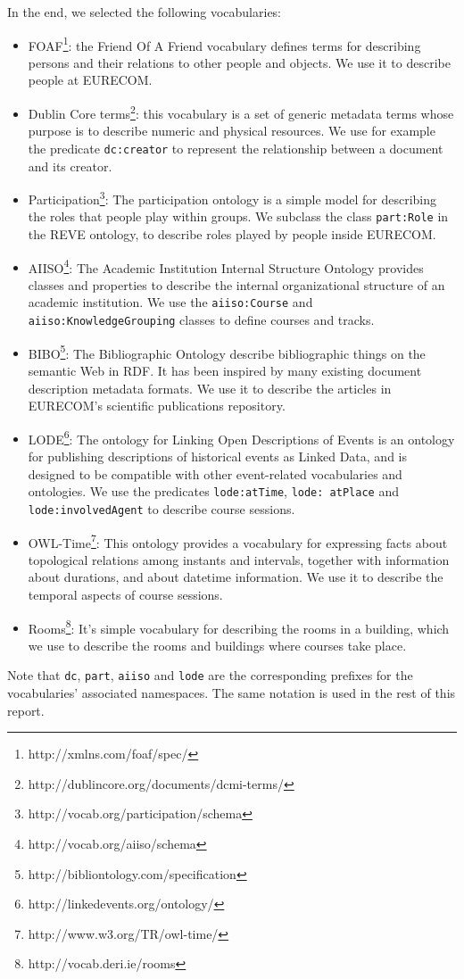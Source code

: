\documentclass[a4paper,11pt]{report}
\begin{document}
In the end, we selected the following vocabularies: 
\begin{itemize}
\item FOAF\footnote{http://xmlns.com/foaf/spec/}: the Friend Of A Friend vocabulary defines terms for describing persons and their relations to other people and objects. We use it to describe people at \mbox{EURECOM}. 
\item Dublin Core terms\footnote{http://dublincore.org/documents/dcmi-terms/}: this vocabulary is a set of generic metadata terms whose purpose is to describe numeric and physical resources. We use for example the predicate \texttt{dc:creator} to represent the relationship between a document and its creator. 
\item Participation\footnote{http://vocab.org/participation/schema}: The participation ontology is a simple model for describing the roles that people play within groups. We subclass the class \texttt{part:Role} in the REVE ontology, to describe roles played by people inside \mbox{EURECOM}. 
\item AIISO\footnote{http://vocab.org/aiiso/schema}: The Academic Institution Internal Structure Ontology provides classes and properties to describe the internal organizational structure of an academic institution. We use the \texttt{aiiso:Course} and \texttt{aiiso:KnowledgeGrouping} classes to define courses and tracks. 
\item BIBO\footnote{http://bibliontology.com/specification}:  The Bibliographic Ontology describe bibliographic things on the semantic Web in RDF. It has been inspired by many existing document description metadata formats. We use it to describe the articles in \mbox{EURECOM}'s scientific publications repository. 
\item LODE\footnote{http://linkedevents.org/ontology/}: The ontology for Linking Open Descriptions of Events is an ontology for publishing descriptions of historical events as Linked Data, and is designed to be compatible with other event-related vocabularies and ontologies. We use the predicates \texttt{lode:atTime}, \texttt{lode: atPlace} and \texttt{lode:involvedAgent} to describe course sessions. 
\item OWL-Time\footnote{http://www.w3.org/TR/owl-time/}: This ontology provides a vocabulary for expressing facts about topological relations among instants and intervals, together with information about durations, and about datetime information. We use it to describe the temporal aspects of course sessions. 
\item Rooms\footnote{http://vocab.deri.ie/rooms}: It's simple vocabulary for describing the rooms in a building, which we use to describe the rooms and buildings where courses take place. 
\end{itemize}
Note that \texttt{dc},  \texttt{part},  \texttt{aiiso} and  \texttt{lode} are the corresponding prefixes for the vocabularies' associated namespaces. The same notation is used in the rest of this report. 
\end{document}
